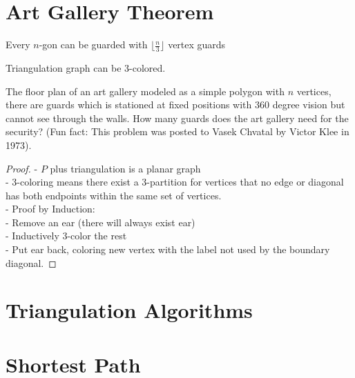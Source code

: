 		\section{Art Gallery Theorem}
			\begin{theorem}
				Every $n$-gon can be guarded with $\lfloor \frac{n}{3} \rfloor$ vertex guards
			\end{theorem}

			\begin{lemma}
				Triangulation graph can be 3-colored.
			\end{lemma}

			\begin{problem}
				The floor plan of an art gallery modeled as a simple polygon with $n$ vertices, there are guards which is stationed at fixed positions with 360 degree vision but cannot see through the walls. How many guards does the art gallery need for the security? (Fun fact: This problem was posted to Vasek Chvatal by Victor Klee in 1973).				
			\end{problem}

			\begin{proof}
				- $P$ plus triangulation is a planar graph\\
				- 3-coloring means there exist a 3-partition for vertices that no edge or diagonal has both endpoints within the same set of vertices.\\
				- Proof by Induction:\\
				\indent - Remove an ear (there will always exist ear) \\
				\indent - Inductively 3-color the rest\\
				\indent - Put ear back, coloring new vertex with the label not used by the boundary diagonal.
			\end{proof}

		\section{Triangulation Algorithms}

		\section{Shortest Path}


